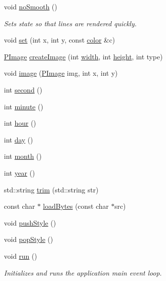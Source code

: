 \begin{DoxyCompactItemize}
void \hyperlink{namespacecprocessing_a1e2a2adb15840df8dd16c8996863a905}{no\-Smooth} ()
\begin{DoxyCompactList}\small\item\em \-Sets state so that lines are rendered quickly. \end{DoxyCompactList}\item 
void \hyperlink{namespacecprocessing_ab9901a77b5bce93f75353a9d43183b2c}{set} (int x, int y, const \hyperlink{classcprocessing_1_1color}{color} \&c)
\item 
\hyperlink{classcprocessing_1_1PImage}{\-P\-Image} \hyperlink{namespacecprocessing_a5e491b64f5f6c2485d3383035138c15b}{create\-Image} (int \hyperlink{namespacecprocessing_a7af937eb8772235def57fcadd10fc82a}{width}, int \hyperlink{namespacecprocessing_ac392753eef02e2ad4ad84f5a076919be}{height}, int type)
\item 
void \hyperlink{namespacecprocessing_a9aa099fb5778d1a4bae8fae7f98abad0}{image} (\hyperlink{classcprocessing_1_1PImage}{\-P\-Image} img, int x, int y)
\item 
int \hyperlink{namespacecprocessing_a66f0b80b6d8a63fcea448fda228a3bef}{second} ()
\item 
int \hyperlink{namespacecprocessing_a9382ebc0ea6d75f30a10c76e250363d3}{minute} ()
\item 
int \hyperlink{namespacecprocessing_a7cb939c2601830024528a43714e200dc}{hour} ()
\item 
int \hyperlink{namespacecprocessing_a23894b5b22c13abcae989418ba4b7043}{day} ()
\item 
int \hyperlink{namespacecprocessing_aecf7ffcc2511c4dd27779f25c1d5d0c9}{month} ()
\item 
int \hyperlink{namespacecprocessing_a37a2ca5a2132ec009826dc5d02c2bd0c}{year} ()
\item 
std\-::string \hyperlink{namespacecprocessing_a22f7836c5ee2ece827cb87f532b69bea}{trim} (std\-::string str)
\item 
const char $\ast$ \hyperlink{namespacecprocessing_a4874f805f42f926ed40ef576dac51201}{load\-Bytes} (const char $\ast$src)
\item 
void \hyperlink{namespacecprocessing_a7d4e83016b65fe24a4c5258de029d090}{push\-Style} ()
\item 
void \hyperlink{namespacecprocessing_a6a4b0f1cede3b31e1da5bfbb4812b479}{pop\-Style} ()
\item 
void \hyperlink{namespacecprocessing_ab37eb8944511fff015ea51aa57755bad}{run} ()
\begin{DoxyCompactList}\small\item\em \-Initializes and runs the application main event loop. \end{DoxyCompactList}\item 

\end{DoxyCompactItemize}
